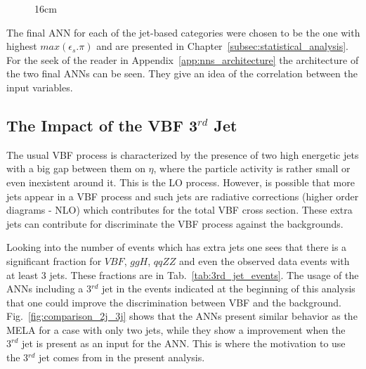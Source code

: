 \begin{figure}[hbtp]{16cm}
	\label{fig:nn_mela_scannings}	
\end{figure}

The final ANN for each of the jet-based categories were chosen to be the one with highest $max(\epsilon_{s}.\pi)$ and are presented in Chapter~\ref{subsec:statistical_analysis}. For the seek of the reader in Appendix~\ref{app:nns_architecture} the architecture of the two final ANNs can be seen. They give an idea of the correlation between the input variables. 

\subsection{The Impact of the VBF 3$^{rd}$ Jet}
The usual VBF process is characterized by the presence of two high energetic jets with a big gap between them on $\eta$, where the particle activity is rather small or even inexistent around it. This is the LO process. However, is possible that more jets appear in a VBF process and such jets are radiative corrections (higher order diagrams - NLO) which contributes for the total VBF cross section. These extra jets can contribute for discriminate the VBF process against the backgrounds.

Looking into the number of events which has extra jets one sees that there is a significant fraction for $VBF$, $ggH$, $qqZZ$ and even the observed data events with at least 3 jets. These fractions are in Tab.~\ref{tab:3rd_jet_events}. The usage of the ANNs including a 3$^{rd}$ jet in the events indicated at the beginning of this analysis that one could improve the discrimination between VBF and the background. Fig.~\ref{fig:comparison_2j_3j} shows that the ANNs present similar behavior as the MELA for a case with only two jets, while they show a improvement when the $3^{rd}$ jet is present as an input for the ANN. This is where the motivation to use the 3$^{rd}$ jet comes from in the present analysis.

